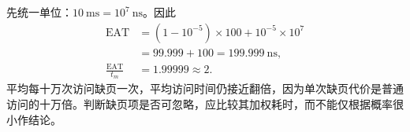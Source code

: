 \begin{checkedsolution}
先统一单位：$10\ \mathrm{ms}=10^7\ \mathrm{ns}$。因此
\[
\begin{aligned}
 \mathrm{EAT}
   &=(1-10^{-5})\times100+10^{-5}\times10^7\\
   &=99.999+100=199.999\ \mathrm{ns},\\
 \frac{\mathrm{EAT}}{t_m}&=1.99999\approx2.
\end{aligned}
\]
平均每十万次访问缺页一次，平均访问时间仍接近翻倍，因为单次缺页代价是普通访问的十万倍。判断缺页项是否可忽略，应比较其加权耗时，而不能仅根据概率很小作结论。
\end{checkedsolution}
\endgroup
